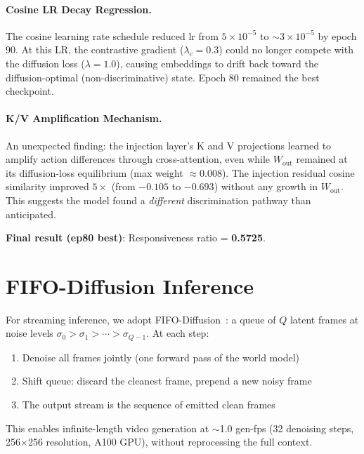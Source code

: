 \documentclass[10pt,twocolumn]{article}
\begin{document}
\paragraph{Cosine LR Decay Regression.}
The cosine learning rate schedule reduced lr from $5{\times}10^{-5}$ to ${\sim}3{\times}10^{-5}$ by epoch 90. At this LR, the contrastive gradient ($\lambda_c{=}0.3$) could no longer compete with the diffusion loss ($\lambda{=}1.0$), causing embeddings to drift back toward the diffusion-optimal (non-discriminative) state. Epoch 80 remained the best checkpoint.

\paragraph{K/V Amplification Mechanism.}
An unexpected finding: the injection layer's K and V projections learned to amplify action differences through cross-attention, even while $W_\text{out}$ remained at its diffusion-loss equilibrium (max weight $\approx 0.008$). The injection residual cosine similarity improved $5\times$ (from $-0.105$ to $-0.693$) without any growth in $W_\text{out}$. This suggests the model found a \emph{different} discrimination pathway than anticipated.

\textbf{Final result (ep80 best)}: Responsiveness ratio = \textbf{0.5725}.

\section{FIFO-Diffusion Inference}

For streaming inference, we adopt FIFO-Diffusion~\cite{kim2024fifo}: a queue of $Q$ latent frames at noise levels $\sigma_0 > \sigma_1 > \cdots > \sigma_{Q-1}$. At each step:
\begin{enumerate}
  \item Denoise all frames jointly (one forward pass of the world model)
  \item Shift queue: discard the cleanest frame, prepend a new noisy frame
  \item The output stream is the sequence of emitted clean frames
\end{enumerate}

This enables infinite-length video generation at $\sim$1.0 gen-fps (32 denoising steps, 256$\times$256 resolution, A100 GPU), without reprocessing the full context.
\end{document}
